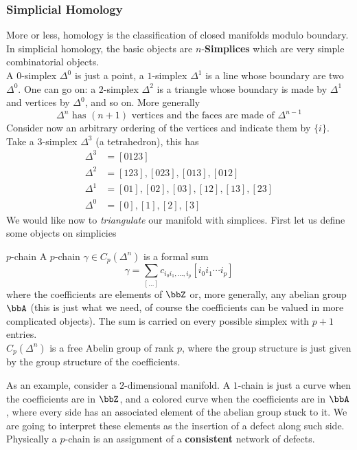 \documentclass[11pt]{article}
\theoremstyle{definition}
\numberwithin{equation}{section}
\begin{document}
\subsubsection{Simplicial Homology}\label{hom}
More or less, homology is the classification of closed manifolds modulo boundary. In simplicial homology, the basic objects are $n$-\textbf{Simplices}  which are very simple combinatorial objects.\\
A $0$-simplex $\Delta^{0}$ is just a point, a $1$-simplex $\Delta^{1}$ is a line whose boundary are two $\Delta^{0}$. One can go on: a $2$-simplex $\Delta^{2}$ is a triangle whose boundary is made by $\Delta^{1}$ and vertices by $\Delta^{0}$, and so on. More generally
\begin{equation}
	\Delta^{n}\text{ has }(n+1)\text{ vertices and the faces are made of }\Delta^{n-1}
\end{equation}
Consider now an arbitrary ordering of the vertices and indicate them by $\{i\}$. Take a $3$-simplex $\Delta^{3}$ (a tetrahedron), this has
\begin{equation}
\begin{split}
	\Delta^{3}&=[0123]\\
	\Delta^{2}&=[123],[023],[013],[012]\\
	\Delta^{1}&=[01],[02],[03],[12],[13],[23]\\
	\Delta^{0}&=[0],[1],[2],[3]
\end{split}
\end{equation}
We would like now to \textit{triangulate} our manifold with simplices. First let us define some objects on simplicies
\begin{defn}{$p$-chain}{}
	A $p$-chain $\gamma\in C_{p}(\Delta^{n})$ is a formal sum
	\begin{equation}
		\gamma=\sum_{[\ldots]}c_{i_{0}i_{1},\ldots,i_{p}}[i_{0}i_{1}\cdots i_{p}]
	\end{equation}
	where the coefficients are elements of $\bbZ$ or, more generally, any abelian group $\bbA$ (this is just what we need, of course the coefficients can be valued in more complicated objects). The sum is carried on every possible simplex with $p+1$ entries.\\
	$C_{p}(\Delta^{n})$ is a free Abelin group of rank $p$, where the group structure is just given by the group structure of the coefficients.
\end{defn}
As an example, consider a $2$-dimensional manifold. A $1$-chain is just a curve when the coefficients are in $\bbZ$, and a colored curve when the coefficients are in $\bbA$, where every side has an associated element of the abelian group stuck to it. We are going to interpret these elements as the insertion of a defect along such side. Physically a $p$-chain is an assignment of a \textbf{consistent} network of defects.\\
\end{document}
